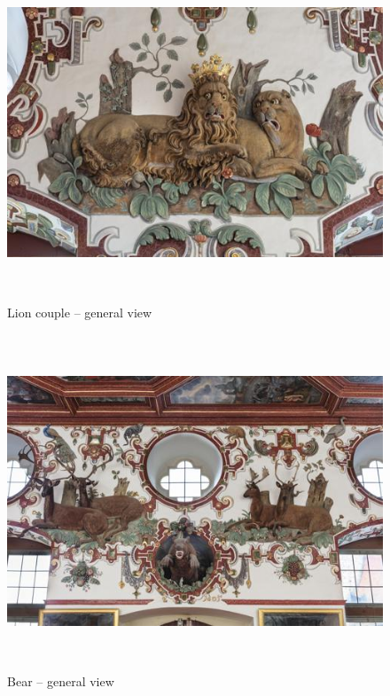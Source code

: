 \documentclass[
  a4paper,
  openany]{book}
\begin{document}
\begin{figure}[H]
\centering
\includegraphics[height=10cm]{./images/fmd10005864a.jpg}
\caption{Lion couple – general view}
\label{fig:{https://previous.bildindex.de/bilder/fmd10005864a.jpg}}
\end{figure}

\clearpage

\begin{figure}[H]
\centering
\includegraphics[height=10cm]{./images/fmd10005865a.jpg}
\caption{Bear – general view}
\label{fig:{https://previous.bildindex.de/bilder/fmd10005865a.jpg}}
\end{figure}

\clearpage
\end{document}

